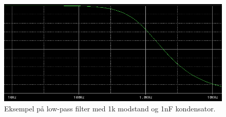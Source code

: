 \begin{figure}[h!]
  \centering
  \includegraphics[width=1.0\textwidth]{figures/low_pass_cut_off_frequency1k_150nF.png}
  \caption{Eksempel på low-pass filter med 1k modstand og 1nF kondensator.}
  \label{low_pass}
\end{figure}

